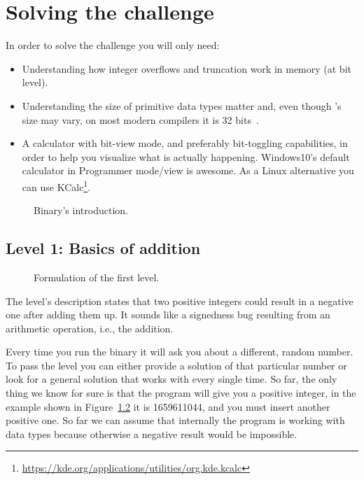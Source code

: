 \chapter{Solving the challenge}

In order to solve the challenge you will only need:
\begin{itemize}
	\item{Understanding how integer overflows and truncation work in memory (at bit level).}
	\item{Understanding the size of primitive data types matter and, even though 's size may vary, on most modern compilers it is 32 bits~\cite{QuoraDataTypesSizes, NewCIntegerC99}.}
	\item{A calculator with bit-view mode, and preferably bit-toggling capabilities, in order to help you visualize what is actually happening. Windows10's default calculator in Programmer mode/view is awesome. As a Linux alternative you can use KCalc\footnote{\url{https://kde.org/applications/utilities/org.kde.kcalc}}.}
\end{itemize}

\begin{figure}[h]
	\label{fig:binary_intro}
	\caption{Binary's introduction.}
\end{figure}

\section{Level 1: Basics of addition}

\begin{figure}[!htbp]
	\caption{Formulation of the first level.}
	\label{fig:intro_level1}
\end{figure}

The level's description states that two positive integers could result in a negative one after adding them up. It sounds like a signedness bug resulting from an arithmetic operation, i.e., the  addition.

Every time you run the binary it will ask you about a different, random number. To pass the level you can either provide a solution of that particular number or look for a general solution that works with every single time. So far, the only thing we know for sure is that the program will give you a positive integer, in the example shown in Figure~\ref{fig:intro_level1} it is 1659611044, and you must insert another positive one. So far we can assume that internally the program is working with  data types because otherwise a negative result would be impossible. 

